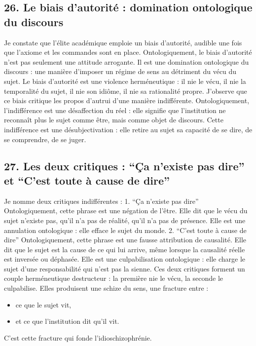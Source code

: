 \documentclass[12pt,a4paper]{article}
\begin{document}
\subsection*{26. Le biais d’autorité : domination ontologique du discours}
Je constate que l’élite académique emploie un biais d’autorité, audible une fois que l’axiome et les commandes sont en place. Ontologiquement, le biais d’autorité n’est pas seulement une attitude arrogante. Il est une domination ontologique du discours : une manière d’imposer un régime de sens au détriment du vécu du sujet.
Le biais d’autorité est une violence herméneutique : il nie le vécu, il nie la temporalité du sujet, il nie son idiôme, il nie sa rationalité propre.
J’observe que ce biais critique les propos d’autrui d’une manière indifférente. Ontologiquement, l’indifférence est une désaffection du réel : elle signifie que l’institution ne reconnaît plus le sujet comme être, mais comme objet de discours.
Cette indifférence est une désubjectivation : elle retire au sujet sa capacité de se dire, de se comprendre, de se juger.

\subsection*{27. Les deux critiques : “Ça n’existe pas dire” et “C’est toute à cause de dire”}
Je nomme deux critiques indifférentes :
1. “Ça n’existe pas dire”
Ontologiquement, cette phrase est une négation de l’être. Elle dit que le vécu du sujet n’existe pas, qu’il n’a pas de réalité, qu’il n’a pas de présence. Elle est une annulation ontologique : elle efface le sujet du monde.
2. “C’est toute à cause de dire”
Ontologiquement, cette phrase est une fausse attribution de causalité. Elle dit que le sujet est la cause de ce qui lui arrive, même lorsque la causalité réelle est inversée ou déphasée. Elle est une culpabilisation ontologique : elle charge le sujet d’une responsabilité qui n’est pas la sienne.
Ces deux critiques forment un couple herméneutique destructeur : la première nie le vécu, la seconde le culpabilise.
Elles produisent une schize du sens, une fracture entre :
\begin{itemize}
\item ce que le sujet vit,
\item et ce que l’institution dit qu’il vit.
\end{itemize}
C’est cette fracture qui fonde l’idioschizophrénie.
\end{document}
